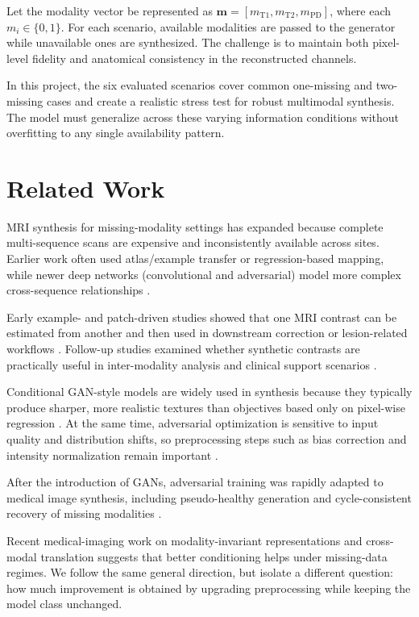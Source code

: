 \documentclass[conference]{IEEEtran}
\begin{document}
Let the modality vector be represented as $\mathbf{m} = [m_{\text{T1}}, m_{\text{T2}}, m_{\text{PD}}]$, where each $m_i \in \{0,1\}$. For each scenario, available modalities are passed to the generator while unavailable ones are synthesized. The challenge is to maintain both pixel-level fidelity and anatomical consistency in the reconstructed channels.

In this project, the six evaluated scenarios cover common one-missing and two-missing cases and create a realistic stress test for robust multimodal synthesis. The model must generalize across these varying information conditions without overfitting to any single availability pattern.

\section{Related Work}
MRI synthesis for missing-modality settings has expanded because complete multi-sequence scans are expensive and inconsistently available across sites. Earlier work often used atlas/example transfer or regression-based mapping, while newer deep networks (convolutional and adversarial) model more complex cross-sequence relationships \cite{roy2013example,roy2016patch,goodfellow2020,pan2018}.

Early example- and patch-driven studies showed that one MRI contrast can be estimated from another and then used in downstream correction or lesion-related workflows \cite{roy2013example,roy2016patch,roy2010}. Follow-up studies examined whether synthetic contrasts are practically useful in inter-modality analysis and clinical support scenarios \cite{iglesias2013,staartjes2021}.

Conditional GAN-style models are widely used in synthesis because they typically produce sharper, more realistic textures than objectives based only on pixel-wise regression \cite{goodfellow2020,pan2018}. At the same time, adversarial optimization is sensitive to input quality and distribution shifts, so preprocessing steps such as bias correction and intensity normalization remain important \cite{vovk2007,tustison2010n4}.

After the introduction of GANs, adversarial training was rapidly adapted to medical image synthesis, including pseudo-healthy generation and cycle-consistent recovery of missing modalities \cite{goodfellow2020,bowles2016,pan2018}.

Recent medical-imaging work on modality-invariant representations and cross-modal translation suggests that better conditioning helps under missing-data regimes. We follow the same general direction, but isolate a different question: how much improvement is obtained by upgrading preprocessing while keeping the model class unchanged.
\end{document}

